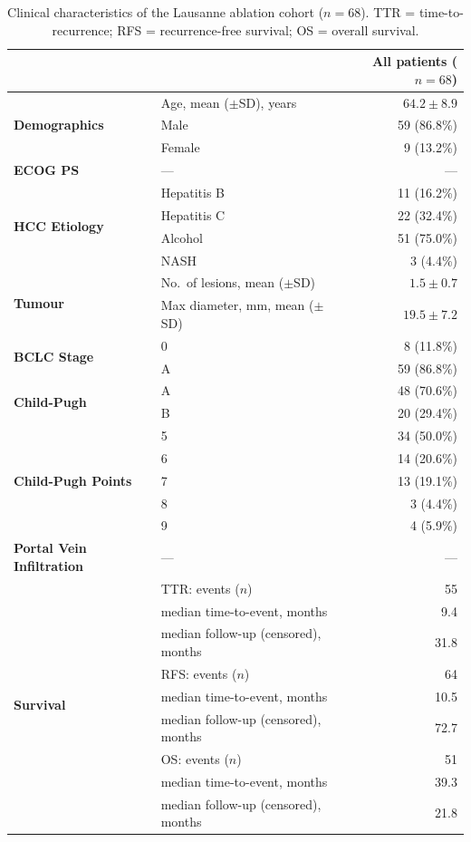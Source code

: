 \documentclass[12pt,twoside]{report}
\begin{document}
\begin{table}[H]
\centering
\small
\caption{Clinical characteristics of the Lausanne ablation cohort ($n=68$).
TTR = time-to-recurrence; RFS = recurrence-free survival; OS = overall survival.}
\label{tab:laussane_clinal}
\begin{tabular}{p{3.8cm}lr}
\hline
 & & All patients ($n=68$) \\
\hline
\multirow{3}{*}{\textbf{Demographics}}
  & Age, mean ($\pm$SD), years & $64.2 \pm 8.9$ \\
  & Male & 59 (86.8\%) \\
  & Female & 9 (13.2\%) \\
\hline
\textbf{ECOG PS} & --- & --- \\
\hline
\multirow{4}{*}{\textbf{HCC Etiology}}
  & Hepatitis B & 11 (16.2\%) \\
  & Hepatitis C & 22 (32.4\%) \\
  & Alcohol & 51 (75.0\%) \\
  & NASH & 3 (4.4\%) \\
\hline
\multirow{2}{*}{\textbf{Tumour}}
  & No.\ of lesions, mean ($\pm$SD) & $1.5 \pm 0.7$ \\
  & Max diameter, mm, mean ($\pm$SD) & $19.5 \pm 7.2$ \\
\hline
\multirow{2}{*}{\textbf{BCLC Stage}}
  & 0 & 8 (11.8\%) \\
  & A & 59 (86.8\%) \\
\hline
\multirow{2}{*}{\textbf{Child-Pugh}}
  & A & 48 (70.6\%) \\
  & B & 20 (29.4\%) \\
\hline
\multirow{5}{*}{\textbf{Child-Pugh Points}}
  & 5 & 34 (50.0\%) \\
  & 6 & 14 (20.6\%) \\
  & 7 & 13 (19.1\%) \\
  & 8 & 3 (4.4\%) \\
  & 9 & 4 (5.9\%) \\
\hline
\textbf{Portal Vein Infiltration} & --- & --- \\
\hline
\multirow{9}{*}{\textbf{Survival}}
  & TTR: events ($n$) & 55 \\
  & \quad median time-to-event, months & 9.4 \\
  & \quad median follow-up (censored), months & 31.8 \\
  & RFS: events ($n$) & 64 \\
  & \quad median time-to-event, months & 10.5 \\
  & \quad median follow-up (censored), months & 72.7 \\
  & OS: events ($n$) & 51 \\
  & \quad median time-to-event, months & 39.3 \\
  & \quad median follow-up (censored), months & 21.8 \\
\hline
\end{tabular}
\end{table}
\end{document}
